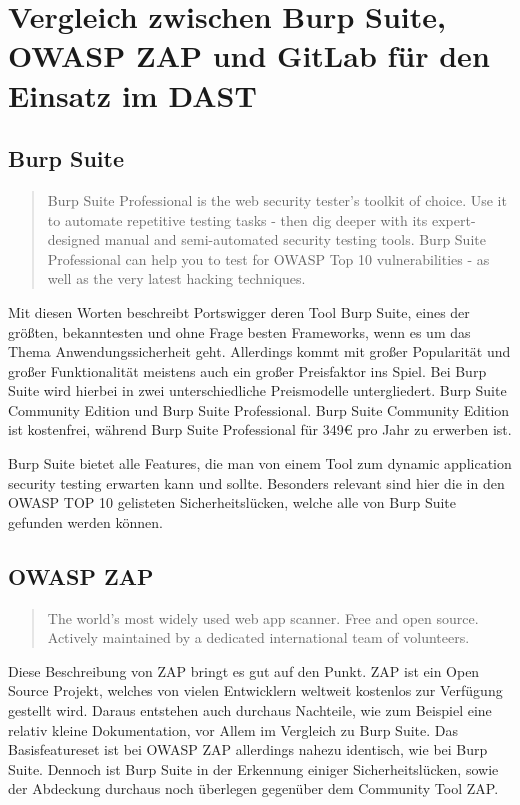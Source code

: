 \section{Vergleich zwischen Burp Suite, OWASP ZAP und GitLab für den Einsatz im DAST}\label{sec:vergleich-zwischen-burp-suite-owasp-zap-und-gitlab-für-den-einsatz-im-dast}
\subsection{Burp Suite}

\begin{quote}
    Burp Suite Professional is the web security tester's toolkit of choice.
    Use it to automate repetitive testing tasks - then dig deeper with its expert-designed manual and semi-automated security testing tools.
    Burp Suite Professional can help you to test for OWASP Top 10 vulnerabilities - as well as the very latest hacking techniques.\cite{BurpSuiteProfessional}
\end{quote}

Mit diesen Worten beschreibt Portswigger deren Tool Burp Suite, eines der größten, bekanntesten und ohne Frage besten Frameworks, wenn es um das Thema Anwendungssicherheit geht.
Allerdings kommt mit großer Popularität und großer Funktionalität meistens auch ein großer Preisfaktor ins Spiel.
Bei Burp Suite wird hierbei in zwei unterschiedliche Preismodelle untergliedert.
Burp Suite Community Edition und Burp Suite Professional.
Burp Suite Community Edition ist kostenfrei, während Burp Suite Professional für 349€ pro Jahr zu erwerben ist.

Burp Suite bietet alle Features, die man von einem Tool zum dynamic application security testing erwarten kann und sollte.
Besonders relevant sind hier die in den OWASP TOP 10\cite{OWASPTopTen} gelisteten Sicherheitslücken, welche alle von Burp Suite gefunden werden können.

\subsection{OWASP ZAP}

\begin{quote}
The world’s most widely used web app scanner.
Free and open source.
Actively maintained by a dedicated international team of volunteers.\cite{ZAPHomepage}
\end{quote}

Diese Beschreibung von ZAP bringt es gut auf den Punkt.
ZAP ist ein Open Source Projekt, welches von vielen Entwicklern weltweit kostenlos zur Verfügung gestellt wird.
Daraus entstehen auch durchaus Nachteile, wie zum Beispiel eine relativ kleine Dokumentation, vor Allem im Vergleich zu Burp Suite.
Das Basisfeatureset ist bei OWASP ZAP allerdings nahezu identisch, wie bei Burp Suite.
Dennoch ist Burp Suite in der Erkennung einiger Sicherheitslücken, sowie der Abdeckung durchaus noch überlegen gegenüber dem Community Tool ZAP.\cite{teamBurpSuiteVs2021}


